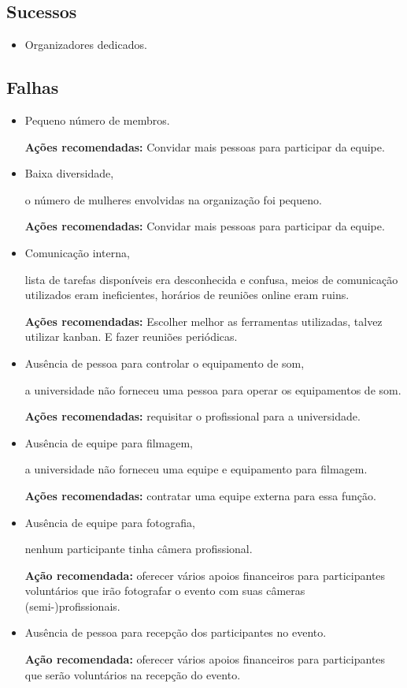 \documentclass[12pt]{article}
\begin{document}
\subsection*{Sucessos}

\begin{itemize}
  \item Organizadores dedicados.
\end{itemize}

\subsection*{Falhas}

\begin{itemize}
  \item Pequeno número de membros.

    \textbf{Ações recomendadas:} Convidar mais pessoas para participar da
    equipe.

  \item Baixa diversidade,

    o número de mulheres envolvidas na organização foi pequeno.

    \textbf{Ações recomendadas:} Convidar mais pessoas para participar da
    equipe.

  \item Comunicação interna,

    lista de tarefas disponíveis era desconhecida e confusa, meios de
    comunicação utilizados eram ineficientes, horários de reuniões online eram
    ruins.

    \textbf{Ações recomendadas:} Escolher melhor as ferramentas utilizadas,
    talvez utilizar kanban.
    E fazer reuniões periódicas.

  \item Ausência de pessoa para controlar o equipamento de som,

    a universidade não forneceu uma pessoa para operar os equipamentos de som.

    \textbf{Ações recomendadas:} requisitar o profissional para a universidade.

  \item Ausência de equipe para filmagem,

    a universidade não forneceu uma equipe e equipamento para filmagem.

    \textbf{Ações recomendadas:} contratar uma equipe externa para essa função.

  \item Ausência de equipe para fotografia,

    nenhum participante tinha câmera profissional.

    \textbf{Ação recomendada:} oferecer vários apoios financeiros para
    participantes voluntários que irão fotografar o evento com suas câmeras
    (semi-)profissionais.

  \item Ausência de pessoa para recepção dos participantes no evento.

    \textbf{Ação recomendada:} oferecer vários apoios financeiros para
    participantes que serão voluntários na recepção do evento.

\end{itemize}
\end{document}
